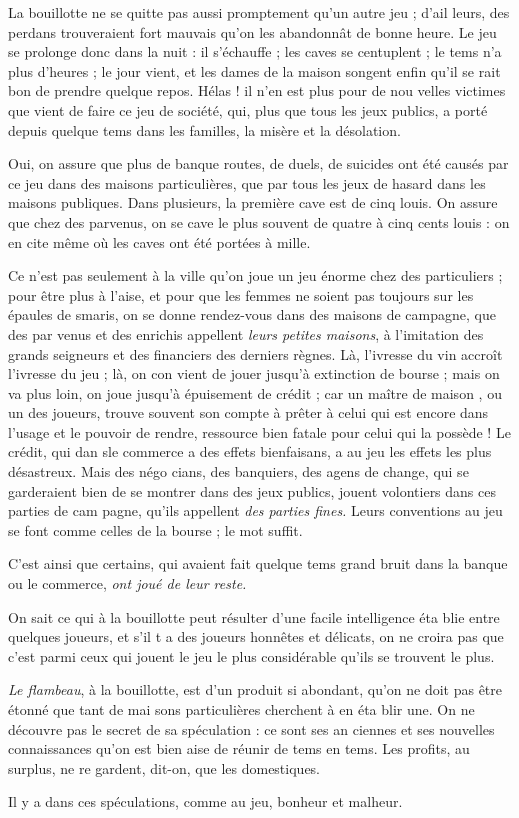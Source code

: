 La bouillotte ne se quitte pas aussi
promptement qu'un autre jeu ; d'ail%
leurs, des perdans trouveraient fort
mauvais qu'on les abandonnât de 
bonne heure. Le jeu se prolonge
donc dans la nuit : il s'échauffe ; les
caves se centuplent ; le tems n'a plus
d'heures ; le jour vient, et les dames
de la maison songent enfin qu'il se%
rait bon de prendre quelque repos.
Hélas ! il n'en est plus pour de nou%
velles victimes que vient de faire ce
jeu de société, qui, plus que tous les
jeux publics, a porté depuis quelque
tems dans les familles, la misère et
la désolation.

Oui, on assure que plus de banque%
routes, de duels, de suicides ont été
causés par ce jeu dans des maisons
particulières, que par tous les jeux
de hasard dans les maisons publiques.
Dans plusieurs, la première cave est
de cinq louis. On assure que chez des
parvenus, on se cave le plus souvent
de quatre à cinq cents louis : on en
cite même où les caves ont été portées
à mille.

Ce n'est pas seulement à la ville
qu'on joue un jeu énorme chez des
particuliers ; pour être plus à l'aise,
et pour que les femmes ne soient pas
toujours sur les épaules de smaris,
on se donne rendez-vous dans des
maisons de campagne, que des par%
venus et des enrichis appellent \emph{leurs
petites maisons}, à l'imitation des 
grands seigneurs et des financiers des
derniers règnes. Là, l'ivresse du vin
accroît l'ivresse du jeu ; là, on con%
vient de jouer jusqu'à extinction de
bourse ; mais on va plus loin, on joue
jusqu'à épuisement de crédit ; car un
maître de maison , ou un des joueurs,
trouve souvent son compte à prêter
à celui qui est encore dans l'usage et
le pouvoir de rendre, ressource bien
fatale pour celui qui la possède ! Le 
crédit, qui dan sle commerce a des
effets bienfaisans, a au jeu les effets
les plus désastreux. Mais des négo%
cians, des banquiers, des agens de
change, qui se garderaient bien de se
montrer dans des jeux publics, jouent
volontiers dans ces parties de cam%
pagne, qu'ils appellent \emph{des parties
fines.} Leurs conventions au jeu se
font comme celles de la bourse ; le
mot suffit.

C'est ainsi que certains, qui avaient
fait quelque tems grand bruit dans la
banque ou le commerce, \emph{ont joué de
leur reste.}

On sait ce qui à la bouillotte peut
résulter d'une facile intelligence éta%
blie entre quelques joueurs, et s'il t
a des joueurs honnêtes et délicats, on
ne croira pas que c'est parmi ceux
qui jouent le jeu le plus considérable
qu'ils se trouvent le plus.

\emph{Le flambeau}, à la bouillotte, est
d'un produit si abondant, qu'on ne
doit pas être étonné que tant de mai%
sons particulières cherchent à en éta%
blir une. On ne découvre pas le secret
de sa spéculation : ce sont ses an%
ciennes et ses nouvelles connaissances
qu'on est bien aise de réunir de tems
en tems. Les profits, au surplus, ne re%
gardent, dit-on, que les domestiques.

Il y a dans ces spéculations, comme
au jeu, bonheur et malheur.
